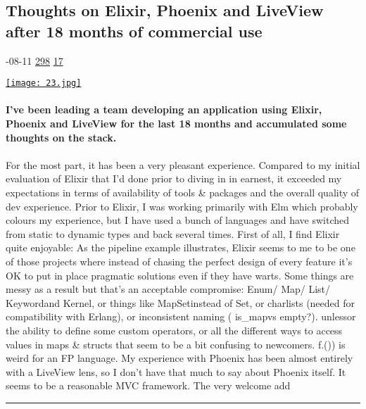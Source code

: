 \documentclass[10pt,a4paper]{article}
\begin{document}
\begin{multicols}{2}
\begin{minipage}{\linewidth}
\subsection{Thoughts on Elixir, Phoenix and LiveView after 18 months of commercial use}
\textsc{\footnotesize
{\scriptsize\faCalendar}-08-11 
{\scriptsize\faThumbsOUp}\space 
\href{http://news.ycombinator.com/item?id=37114457\&utm\_term=comment}{298} 
{\scriptsize\faComments}\space 
\href{http://news.ycombinator.com/item?id=37114457\&utm\_term=comment}{17} 
}
\par\medskip\noindent
\href{https://korban.net/posts/2023-08-11-thoughts-on-elixir-phoenix-liveview/?utm\_source=hackernewsletter\&utm\_medium=email\&utm\_term=code}{
    \texttt{[image: 23.jpg]}
}
\end{minipage}
\paragraph{}
\textbf{I’ve been leading a team developing an application using Elixir, Phoenix and LiveView for the last 18 months and accumulated some thoughts on the stack.}
\paragraph{}
 For the most part, it has been a very pleasant experience.
Compared to my initial evaluation of Elixir that I’d done prior to diving in in earnest, it exceeded my expectations in terms of availability of tools \& packages and the overall quality of dev experience.
Prior to Elixir, I was working primarily with Elm which probably colours my experience, but I have used a bunch of languages and have switched from static to dynamic types and back several times.
First of all, I find Elixir quite enjoyable:
As the pipeline example illustrates, Elixir seems to me to be one of those projects where instead of chasing the perfect design of every feature it’s OK to put in place pragmatic solutions even if they have warts. Some things are messy as a result but that’s an acceptable compromise:
Enum/
Map/
List/
Keywordand
Kernel, or things like
MapSetinstead of
Set, or charlists (needed for compatibility with Erlang), or inconsistent naming (
is\_mapvs
empty?).
unlessor the ability to define some custom operators, or all the different ways to access values in maps \& structs that seem to be a bit confusing to newcomers.
f.()) is weird for an FP language.
My experience with Phoenix has been almost entirely with a LiveView lens, so I don’t have that much to say about Phoenix itself. It seems to be a reasonable MVC framework. The very welcome add
\par\noindent\textcolor{red}{\rule{\linewidth}{0.2mm}}
\vfill
\null
\noindent\begin{minipage}{\linewidth}

\end{minipage}
\end{multicols}
\end{document}
